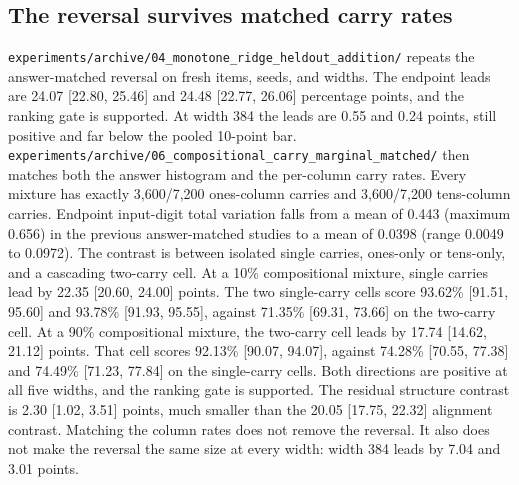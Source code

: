 \subsection{The reversal survives matched carry rates}
\label{sec:exp06}
\texttt{experiments/archive/04\_monotone\_ridge\_heldout\_addition/} repeats the answer-matched reversal on fresh items, seeds, and widths.
The endpoint leads are 24.07 [22.80, 25.46] and 24.48 [22.77, 26.06] percentage points, and the ranking gate is supported.
At width 384 the leads are 0.55 and 0.24 points, still positive and far below the pooled 10-point bar.
\texttt{experiments/archive/06\_compositional\_carry\_marginal\_matched/} then matches both the answer histogram and the per-column carry rates.
Every mixture has exactly 3{,}600/7{,}200 ones-column carries and 3{,}600/7{,}200 tens-column carries.
Endpoint input-digit total variation falls from a mean of 0.443 (maximum 0.656) in the previous answer-matched studies to a mean of 0.0398 (range 0.0049 to 0.0972).
The contrast is between isolated single carries, ones-only or tens-only, and a cascading two-carry cell.
At a 10\% compositional mixture, single carries lead by 22.35 [20.60, 24.00] points.
The two single-carry cells score 93.62\% [91.51, 95.60] and 93.78\% [91.93, 95.55], against 71.35\% [69.31, 73.66] on the two-carry cell.
At a 90\% compositional mixture, the two-carry cell leads by 17.74 [14.62, 21.12] points.
That cell scores 92.13\% [90.07, 94.07], against 74.28\% [70.55, 77.38] and 74.49\% [71.23, 77.84] on the single-carry cells.
Both directions are positive at all five widths, and the ranking gate is supported.
The residual structure contrast is 2.30 [1.02, 3.51] points, much smaller than the 20.05 [17.75, 22.32] alignment contrast.
Matching the column rates does not remove the reversal.
It also does not make the reversal the same size at every width: width 384 leads by 7.04 and 3.01 points.

